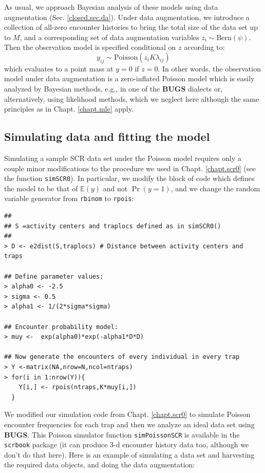 As usual, we approach Bayesian analysis of these models using data
augmentation (Sec. \ref{closed.sec.da}).  Under data augmentation, we
introduce a collection of all-zero encounter histories to bring the
total size of the data set up to $M$, and a corresponding set of data
augmentation variables $z_{i} \sim \mbox{Bern}(\psi)$. Then the
observation model is specified conditional on $z$ according to:
\[
y_{ij} \sim  \mbox{Poisson}(z_{i} K  \lambda_{ij})
\]
which evaluates to a point mass at $y=0$ if $z=0$.  In other words,
the observation model under data augmentation is a zero-inflated
Poisson model which is easily analyzed by Bayesian methods, e.g., in
one of the {\bf BUGS} dialects or, alternatively, using likelihood
methods, which we neglect here although the same principles as in
Chapt. \ref{chapt.mle} apply.


\subsection{Simulating data and fitting the model}


Simulating a sample SCR data set under the Poisson model requires only
a couple minor modifications to the procedure we used in
Chapt. \ref{chapt.scr0} (see the function \mbox{\tt simSCR0}). In
particular, we modify the block of code which defines the model to be
that of $\mathbb{E}(y)$ and not $\Pr(y=1)$, and we change the random
variable generator from \mbox{\tt rbinom} to \mbox{\tt rpois}:
\begin{samepage}
{\small
\begin{verbatim}
##
## S =activity centers and traplocs defined as in simSCR0()
##
> D <- e2dist(S,traplocs) # Distance between activity centers and traps

## Define parameter values:
> alpha0 <- -2.5
> sigma <- 0.5
> alpha1 <- 1/(2*sigma*sigma)

## Encounter probability model:
> muy <-  exp(alpha0)*exp(-alpha1*D*D)

## Now generate the encounters of every individual in every trap
> Y <-matrix(NA,nrow=N,ncol=ntraps)
> for(i in 1:nrow(Y)){
    Y[i,] <- rpois(ntraps,K*muy[i,])
  }
\end{verbatim}
}
\end{samepage}

We modified our simulation code from Chapt. \ref{chapt.scr0} to
simulate Poisson encounter frequencies for each trap and then we
analyze an ideal data set using {\bf BUGS}. This Poisson simulator
function {\tt simPoissonSCR} is available in the \mbox{\tt scrbook}
package (it can produce 3-d encounter history data too, although we
don't do that here).  Here is an example of simulating a data set and
harvesting the required data objects, and doing the data augmentation:

